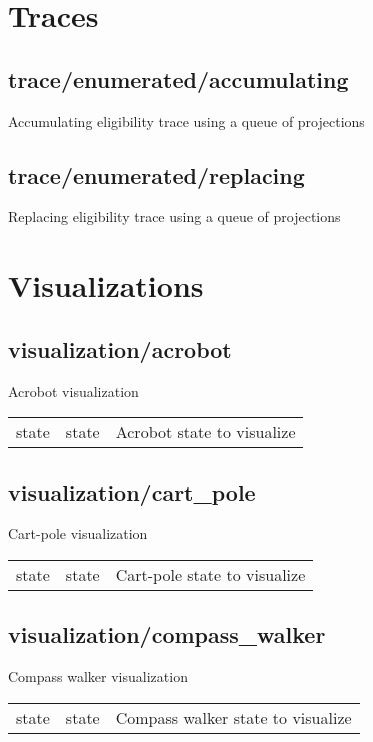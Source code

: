 \section{Traces}
\subsection{trace/enumerated/accumulating}
\noindent Accumulating eligibility trace using a queue of projections\\

\subsection{trace/enumerated/replacing}
\noindent Replacing eligibility trace using a queue of projections\\

\section{Visualizations}
\subsection{visualization/acrobot}
\noindent Acrobot visualization\\

\noindent\begin{tabular}{@{}lll@{}}
state&state&Acrobot state to visualize\\
\end{tabular}
\subsection{visualization/cart\_pole}
\noindent Cart-pole visualization\\

\noindent\begin{tabular}{@{}lll@{}}
state&state&Cart-pole state to visualize\\
\end{tabular}
\subsection{visualization/compass\_walker}
\noindent Compass walker visualization\\

\noindent\begin{tabular}{@{}lll@{}}
state&state&Compass walker state to visualize\\
\end{tabular}

